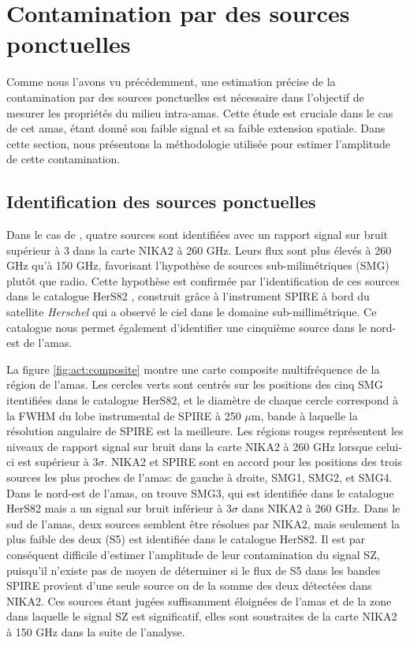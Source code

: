 \section{Contamination par des sources ponctuelles}\label{sec:act:ps}

Comme nous l'avons vu précédemment, une estimation précise de la contamination par des sources ponctuelles est nécessaire dans l'objectif de mesurer les propriétés du milieu intra-amas.
Cette étude est cruciale dans le cas de cet amas, étant donné son faible signal et sa faible extension spatiale.
Dans cette section, nous présentons la méthodologie utilisée pour estimer l'amplitude de cette contamination.

\subsection{Identification des sources ponctuelles}

Dans le cas de \act, quatre sources sont identifiées avec un rapport signal sur bruit supérieur à 3 dans la carte NIKA2 à 260 GHz.
Leurs flux sont plus élevés à 260 GHz qu'à 150 GHz, favorisant l'hypothèse de sources sub-milimétriques (SMG) plutôt que radio.
Cette hypothèse est confirmée par l'identification de ces sources dans le catalogue HerS82 \cite{viero_herschel_2014}, construit grâce à l'instrument SPIRE à bord du satellite \textit{Herschel} qui a observé le ciel dans le domaine sub-millimétrique.
Ce catalogue nous permet également d'identifier une cinquième source dans le nord-est de l'amas.

La figure \ref{fig:act:composite} montre une carte composite multifréquence de la région de l'amas.
Les cercles verts sont centrés sur les positions des cinq SMG itentifiées dans le catalogue HerS82, et le diamètre de chaque cercle correspond à la FWHM du lobe instrumental de SPIRE à 250 $\mu$m, bande à laquelle la résolution angulaire de SPIRE est la meilleure.
Les régions rouges représentent les niveaux de rapport signal sur bruit dans la carte NIKA2 à 260 GHz lorsque celui-ci est supérieur à $3\sigma$.
NIKA2 et SPIRE sont en accord pour les positions des trois sources les plus proches de l'amas: de gauche à droite, SMG1, SMG2, et SMG4.
Dans le nord-est de l'amas, on trouve SMG3, qui est identifiée dans le catalogue HerS82 mais a un signal sur bruit inférieur à $3\sigma$ dans NIKA2 à 260 GHz.
Dans le sud de l'amas, deux sources semblent être résolues par NIKA2, mais seulement la plus faible des deux (S5) est identifiée dans le catalogue HerS82.
Il est par conséquent difficile d'estimer l'amplitude de leur contamination du signal SZ, puisqu'il n'existe pas de moyen de déterminer si le flux de S5 dans les bandes SPIRE provient d'une seule source ou de la somme des deux détectées dans NIKA2.
Ces sources étant jugées suffisamment éloignées de l'amas et de la zone dans laquelle le signal SZ est significatif, elles sont soustraites de la carte NIKA2 à 150 GHz dans la suite de l'analyse.

